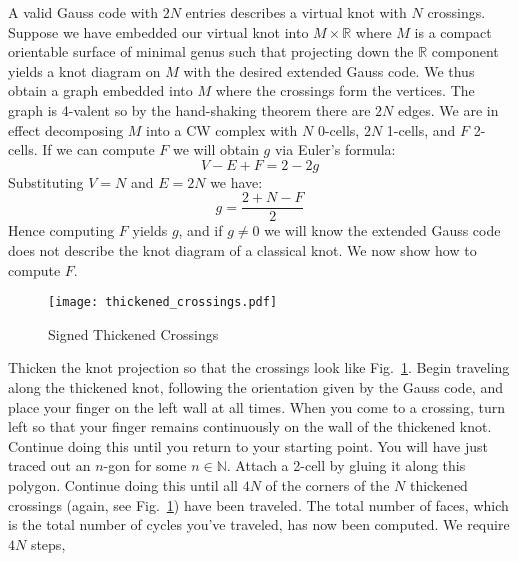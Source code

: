         A valid Gauss code with $2N$ entries describes a virtual knot with
        $N$ crossings. Suppose we have embedded our virtual knot into
        $M\times\mathbb{R}$ where $M$ is a compact orientable surface of
        minimal genus such that projecting down the $\mathbb{R}$ component
        yields a knot diagram on $M$ with the desired extended Gauss code.
        We thus obtain a graph embedded into $M$ where the crossings form the
        vertices. The graph is 4-valent so by the hand-shaking theorem there
        are $2N$ edges. We are in effect decomposing $M$ into a CW complex with
        $N$ 0-cells, $2N$ 1-cells, and $F$ 2-cells. If we can compute $F$ we
        will obtain $g$ via Euler's formula:
        \begin{equation}
            V-E+F=2-2g
        \end{equation}
        Substituting $V=N$ and $E=2N$ we have:
        \begin{equation}
            g=\frac{2+N-F}{2}
        \end{equation}
        Hence computing $F$ yields $g$, and if $g\ne{0}$ we will know the
        extended Gauss code does not describe the knot diagram of a
        classical knot. We now show how to compute $F$.
        \par\hfill\par
        \begin{figure}
            \centering
            \texttt{[image: thickened\_crossings.pdf]}
            \caption{Signed Thickened Crossings}
            \label{fig:thickened_crossings_chapt1}
        \end{figure}
        Thicken the knot projection so that the crossings look like
        Fig.~\ref{fig:thickened_crossings_chapt1}.
        Begin traveling along the thickened
        knot, following the orientation given by the Gauss code, and place your
        finger on the left wall at all times. When you come to a crossing,
        turn left so that your finger remains continuously on the wall of the
        thickened knot. Continue doing this until you return to your starting
        point. You will have just traced out an $n$-gon for some
        $n\in\mathbb{N}$. Attach a 2-cell by gluing it along this polygon.
        Continue doing this until all $4N$ of the corners of the $N$ thickened
        crossings (again, see Fig.~\ref{fig:thickened_crossings_chapt1}) have
        been traveled. The total number of faces, which is the total number of
        cycles you've traveled, has now been computed. We require $4N$ steps,
